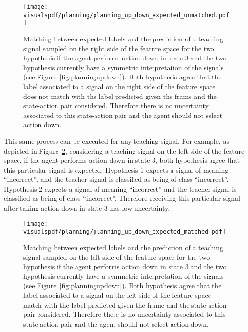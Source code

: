 \begin{figure}[!htbp]
  \centering
  \texttt{[image: \\visualspdf/planning/planning\_up\_down\_expected\_unmatched.pdf]}
  \caption{Matching between expected labels and the prediction of a teaching signal sampled on the right side of the feature space for the two hypothesis if the agent performs action down in state 3 and the two hypothesis currently have a symmetric interpretation of the signals (see Figure~\ref{fig:planningupdown}). Both hypothesis agree that the label associated to a signal on the right side of the feature space does not match with the label predicted given the frame and the state-action pair considered. Therefore there is no uncertainty associated to this state-action pair and the agent should not select action down.}
  \label{fig:uncertaintymeaningupdownexpectedright}
\end{figure}

This same process can be executed for any teaching signal. For example, as depicted in Figure~\ref{fig:uncertaintymeaningupdownexpectedleft}, considering a teaching signal on the left side of the feature space, if the agent performs action down in state 3, both hypothesis agree that this particular signal is expected. Hypothesis 1 expects a signal of meaning ``incorrect'', and the teacher signal is classified as being of class ``incorrect''. Hypothesis 2 expects a signal of meaning ``incorrect'' and the teacher signal is classified as being of class ``incorrect''. Therefore receiving this particular signal after taking action down in state 3 has low uncertainty.

\begin{figure}[!htbp]
  \centering
  \texttt{[image: \\visualspdf/planning/planning\_up\_down\_expected\_matched.pdf]}
  \caption{Matching between expected labels and the prediction of a teaching signal sampled on the left side of the feature space for the two hypothesis if the agent performs action down in state 3 and the two hypothesis currently have a symmetric interpretation of the signals (see Figure~\ref{fig:planningupdown}). Both hypothesis agree that the label associated to a signal on the left side of the feature space match with the label predicted given the frame and the state-action pair considered. Therefore there is no uncertainty associated to this state-action pair and the agent should not select action down.}
  \label{fig:uncertaintymeaningupdownexpectedleft}
\end{figure}

